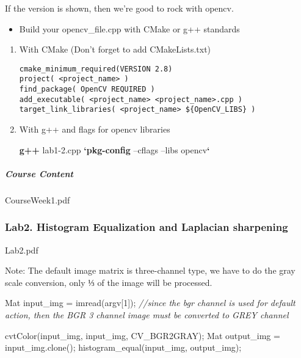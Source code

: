\documentclass[]{article}
\newenvironment{Shaded}{\begin{snugshade}}{\end{snugshade}}
\newcommand{\KeywordTok}[1]{\textcolor[rgb]{0.13,0.29,0.53}{\textbf{{#1}}}}
\newcommand{\DecValTok}[1]{\textcolor[rgb]{0.00,0.00,0.81}{{#1}}}
\newcommand{\CommentTok}[1]{\textcolor[rgb]{0.56,0.35,0.01}{\textit{{#1}}}}
\newcommand{\NormalTok}[1]{{#1}}
\providecommand{\tightlist}{%
  \setlength{\itemsep}{0pt}\setlength{\parskip}{0pt}}
\let\oldsubparagraph\subparagraph
\renewcommand{\subparagraph}[1]{\oldsubparagraph{#1}\mbox{}}
\begin{document}
If the version is shown, then we're good to rock with opencv.

\begin{itemize}
\tightlist
\item
  Build your opencv\_file.cpp with CMake or g++ standards
\end{itemize}

\begin{enumerate}
\def\labelenumi{\arabic{enumi}.}
\item
  With CMake (Don't forget to add CMakeLists.txt)

\begin{verbatim}
cmake_minimum_required(VERSION 2.8)
project( <project_name> )
find_package( OpenCV REQUIRED )
add_executable( <project_name> <project_name>.cpp )
target_link_libraries( <project_name> ${OpenCV_LIBS} )
\end{verbatim}
\item
  With g++ and flags for opencv libraries

\begin{Shaded}
\begin{Highlighting}[]
\KeywordTok{g++} \NormalTok{lab1-2.cpp }\KeywordTok{`pkg-config} \NormalTok{--cflags --libs opencv}\KeywordTok{`}
\end{Highlighting}
\end{Shaded}
\end{enumerate}

\subparagraph{Course Content}\label{course-content}

CourseWeek1.pdf

\subsubsection{Lab2. Histogram Equalization and Laplacian
sharpening}\label{lab2.-histogram-equalization-and-laplacian-sharpening}

Lab2.pdf

Note: The default image matrix is three-channel type, we have to do the
gray scale conversion, only ⅓ of the image will be processed.

\begin{Shaded}
\begin{Highlighting}[]
\NormalTok{Mat input_img = imread(argv[}\DecValTok{1}\NormalTok{]);}
\CommentTok{//since the bgr channel is used for default action, then the BGR 3 channel image must be converted to GREY channel}

\NormalTok{cvtColor(input_img, input_img, CV_BGR2GRAY);}
\NormalTok{Mat output_img = input_img.clone();}
\NormalTok{histogram_equal(input_img, output_img);}
\end{Highlighting}
\end{Shaded}
\end{document}
